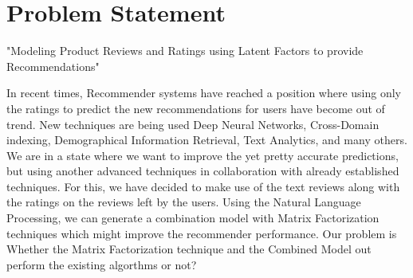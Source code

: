 \section{Problem Statement}

"Modeling Product Reviews and Ratings using Latent Factors to provide Recommendations"

In recent times, Recommender systems have reached a position where using only the ratings to predict the new recommendations for users have become out of trend. New techniques are being used Deep Neural Networks, Cross-Domain indexing, Demographical Information Retrieval, Text Analytics, and many others. We are in a state where we want to improve the yet pretty accurate predictions, but using another advanced techniques in collaboration with already established techniques. For this, we have decided to make use of the text reviews along with the ratings on the reviews left by the users. Using the Natural Language Processing, we can generate a combination model with Matrix Factorization techniques which might improve the recommender performance. Our problem is Whether the Matrix Factorization technique and the Combined Model out perform the existing algorthms or not?


